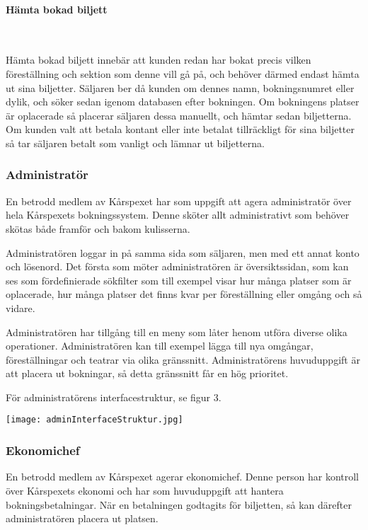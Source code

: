 \documentclass[a4paper, twoside, 11pt, titlepage]{article}
\begin{document}
			\paragraph{Hämta bokad biljett}\

			Hämta bokad biljett innebär att kunden redan har bokat precis vilken föreställning och sektion som denne vill gå på, och behöver därmed endast hämta ut sina biljetter. Säljaren ber då kunden om dennes namn, bokningsnumret eller dylik, och söker sedan igenom databasen efter bokningen. Om bokningens platser är oplacerade så placerar säljaren dessa manuellt, och hämtar sedan biljetterna. Om kunden valt att betala kontant eller inte betalat tillräckligt för sina biljetter så tar säljaren betalt som vanligt och lämnar ut biljetterna.

		\subsubsection{Administratör}


		En betrodd medlem av Kårspexet har som uppgift att agera administratör över hela Kårspexets bokningssystem. Denne sköter allt administrativt som behöver skötas både framför och bakom kulisserna. 

		Administratören loggar in på samma sida som säljaren, men med ett annat konto och lösenord. Det första som möter administratören är översiktssidan, som kan ses som fördefinierade sökfilter som till exempel visar hur många platser som är oplacerade, hur många platser det finns kvar per föreställning eller omgång och så vidare. 

		Administratören har tillgång till en meny som låter henom utföra diverse olika operationer. Administratören kan till exempel lägga till nya omgångar, föreställningar och teatrar via olika gränssnitt. Administratörens huvuduppgift är att placera ut bokningar, så detta gränssnitt får en hög prioritet.  

		För administratörens interfacestruktur, se figur 3.

		\texttt{[image: adminInterfaceStruktur.jpg]}

		\subsubsection{Ekonomichef}


		En betrodd medlem av Kårspexet agerar ekonomichef. Denne person har kontroll över Kårspexets ekonomi och har som huvuduppgift att hantera bokningsbetalningar. När en betalningen godtagits för biljetten, så kan därefter administratören placera ut platsen.
\end{document}
